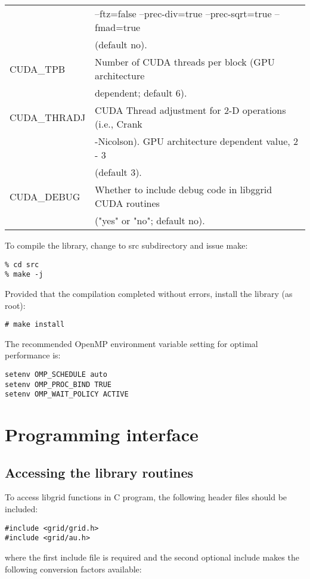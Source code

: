 \documentclass[12pt,letterpaper]{report}
\begin{document}
\begin{tabular}{ll}
               & --ftz=false --prec-div=true --prec-sqrt=true --fmad=true\\
               & (default no).\\
CUDA\_TPB & Number of CUDA threads per block (GPU architecture\\
          & dependent; default 6).\\
CUDA\_THRADJ & CUDA Thread adjustment for 2-D operations (i.e., Crank\\
             & -Nicolson). GPU architecture dependent value, 2 - 3\\
             & (default 3).\\
CUDA\_DEBUG & Whether to include debug code in libggrid CUDA routines\\
            & ("yes" or "no"; default no).\\
\end{tabular}
To compile the library, change to src subdirectory and issue make:
\begin{verbatim}
% cd src
% make -j
\end{verbatim}
Provided that the compilation completed without errors, install the library (as root):
\begin{verbatim}
# make install
\end{verbatim}

The recommended OpenMP environment variable setting for optimal performance is:
\begin{verbatim}
setenv OMP_SCHEDULE auto
setenv OMP_PROC_BIND TRUE
setenv OMP_WAIT_POLICY ACTIVE
\end{verbatim}

\chapter{Programming interface}

\section{Accessing the library routines}

To access libgrid functions in C program, the following header files should be included:
\begin{verbatim}
#include <grid/grid.h>
#include <grid/au.h>
\end{verbatim}
where the first include file is required and the second optional include makes the following conversion factors available:\\
\end{document}
